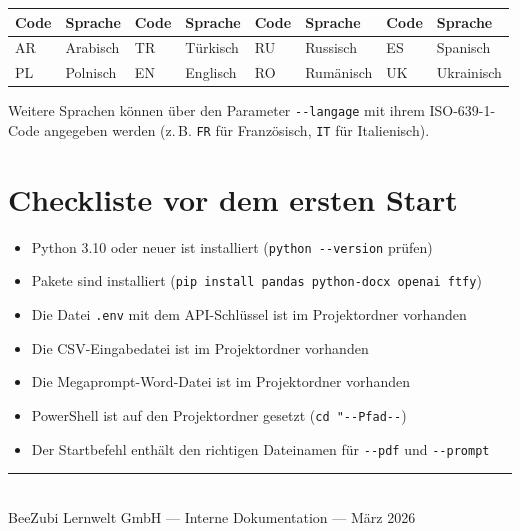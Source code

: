 \documentclass[a4paper,11pt]{article}
\begin{document}
\begin{center}
\begin{tabular}{@{}ll@{\qquad}ll@{\qquad}ll@{\qquad}ll@{}}
\toprule
\textbf{Code} & \textbf{Sprache} &
\textbf{Code} & \textbf{Sprache} &
\textbf{Code} & \textbf{Sprache} &
\textbf{Code} & \textbf{Sprache} \\
\midrule
AR & Arabisch  & TR & Türkisch & RU & Russisch & ES & Spanisch \\
PL & Polnisch  & EN & Englisch & RO & Rumänisch & UK & Ukrainisch \\
\bottomrule
\end{tabular}
\end{center}

Weitere Sprachen können über den Parameter \texttt{-{}-langage} mit ihrem
ISO-639-1-Code angegeben werden (z.\,B. \texttt{FR} für Französisch,
\texttt{IT} für Italienisch).

\section{Checkliste vor dem ersten Start}

\begin{itemize}[label=\(\square\), itemsep=4pt, leftmargin=2em]
  \item Python 3.10 oder neuer ist installiert (\texttt{python -{}-version} prüfen)
  \item Pakete sind installiert (\texttt{pip install pandas python-docx openai ftfy})
  \item Die Datei \texttt{.env} mit dem API-Schlüssel ist im Projektordner vorhanden
  \item Die CSV-Eingabedatei ist im Projektordner vorhanden
  \item Die Megaprompt-Word-Datei ist im Projektordner vorhanden
  \item PowerShell ist auf den Projektordner gesetzt (\texttt{cd "-{}-Pfad-{}-})
  \item Der Startbefehl enthält den richtigen Dateinamen für \texttt{-{}-pdf}
        und \texttt{-{}-prompt}
\end{itemize}

\vspace{1em}
\begin{center}
\rule{0.5\linewidth}{0.4pt}\\[0.4em]
{\small\color{grau}BeeZubi Lernwelt GmbH — Interne Dokumentation — März 2026}
\end{center}
\end{document}
